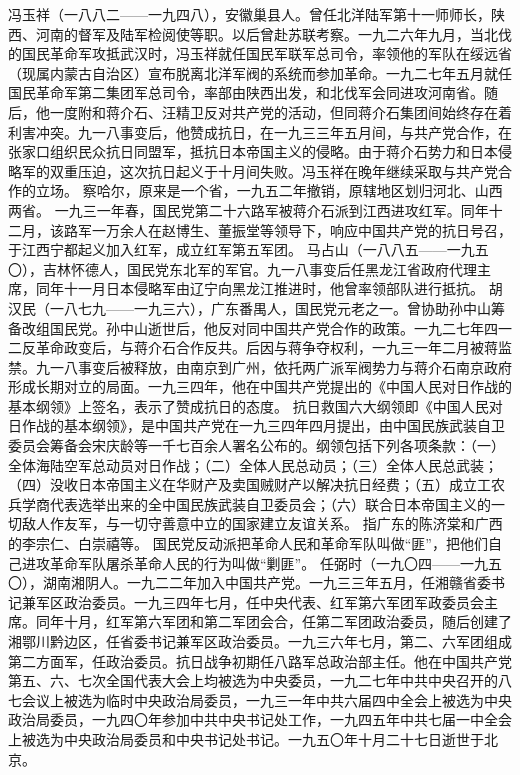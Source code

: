 \begin{maonote}
冯玉祥（一八八二——一九四八），安徽巢县人。曾任北洋陆军第十一师师长，陕西、河南的督军及陆军检阅使等职。以后曾赴苏联考察。一九二六年九月，当北伐的国民革命军攻抵武汉时，冯玉祥就任国民军联军总司令，率领他的军队在绥远省（现属内蒙古自治区）宣布脱离北洋军阀的系统而参加革命。一九二七年五月就任国民革命军第二集团军总司令，率部由陕西出发，和北伐军会同进攻河南省。随后，他一度附和蒋介石、汪精卫反对共产党的活动，但同蒋介石集团间始终存在着利害冲突。九一八事变后，他赞成抗日，在一九三三年五月间，与共产党合作，在张家口组织民众抗日同盟军，抵抗日本帝国主义的侵略。由于蒋介石势力和日本侵略军的双重压迫，这次抗日起义于十月间失败。冯玉祥在晚年继续采取与共产党合作的立场。
察哈尔，原来是一个省，一九五二年撤销，原辖地区划归河北、山西两省。
一九三一年春，国民党第二十六路军被蒋介石派到江西进攻红军。同年十二月，该路军一万余人在赵博生、董振堂等领导下，响应中国共产党的抗日号召，于江西宁都起义加入红军，成立红军第五军团。
马占山（一八八五——一九五〇），吉林怀德人，国民党东北军的军官。九一八事变后任黑龙江省政府代理主席，同年十一月日本侵略军由辽宁向黑龙江推进时，他曾率领部队进行抵抗。
胡汉民（一八七九——一九三六），广东番禺人，国民党元老之一。曾协助孙中山筹备改组国民党。孙中山逝世后，他反对同中国共产党合作的政策。一九二七年四一二反革命政变后，与蒋介石合作反共。后因与蒋争夺权利，一九三一年二月被蒋监禁。九一八事变后被释放，由南京到广州，依托两广派军阀势力与蒋介石南京政府形成长期对立的局面。一九三四年，他在中国共产党提出的《中国人民对日作战的基本纲领》上签名，表示了赞成抗日的态度。
抗日救国六大纲领即《中国人民对日作战的基本纲领》，是中国共产党在一九三四年四月提出，由中国民族武装自卫委员会筹备会宋庆龄等一千七百余人署名公布的。纲领包括下列各项条款：（一）全体海陆空军总动员对日作战；（二）全体人民总动员；（三）全体人民总武装；（四）没收日本帝国主义在华财产及卖国贼财产以解决抗日经费；（五）成立工农兵学商代表选举出来的全中国民族武装自卫委员会；（六）联合日本帝国主义的一切敌人作友军，与一切守善意中立的国家建立友谊关系。
指广东的陈济棠和广西的李宗仁、白崇禧等。
国民党反动派把革命人民和革命军队叫做“匪”，把他们自己进攻革命军队屠杀革命人民的行为叫做“剿匪”。
任弼时（一九〇四——一九五〇），湖南湘阴人。一九二二年加入中国共产党。一九三三年五月，任湘赣省委书记兼军区政治委员。一九三四年七月，任中央代表、红军第六军团军政委员会主席。同年十月，红军第六军团和第二军团会合，任第二军团政治委员，随后创建了湘鄂川黔边区，任省委书记兼军区政治委员。一九三六年七月，第二、六军团组成第二方面军，任政治委员。抗日战争初期任八路军总政治部主任。他在中国共产党第五、六、七次全国代表大会上均被选为中央委员，一九二七年中共中央召开的八七会议上被选为临时中央政治局委员，一九三一年中共六届四中全会上被选为中央政治局委员，一九四〇年参加中共中央书记处工作，一九四五年中共七届一中全会上被选为中央政治局委员和中央书记处书记。一九五〇年十月二十七日逝世于北京。

\end{maonote}
